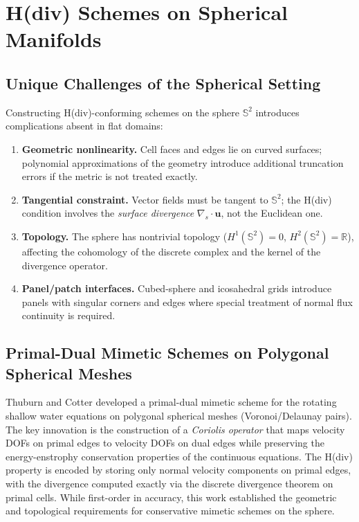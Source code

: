 \section{H(div) Schemes on Spherical Manifolds}

\subsection{Unique Challenges of the Spherical Setting}

Constructing H(div)-conforming schemes on the sphere $\mathbb{S}^2$
introduces complications absent in flat domains:
\begin{enumerate}[nosep]
  \item \textbf{Geometric nonlinearity.} Cell faces and edges lie on
        curved surfaces; polynomial approximations of the geometry
        introduce additional truncation errors if the metric is not
        treated exactly.
  \item \textbf{Tangential constraint.} Vector fields must be tangent to
        $\mathbb{S}^2$; the H(div) condition involves the \emph{surface
        divergence} $\nabla_s \cdot \mathbf{u}$, not the Euclidean one.
  \item \textbf{Topology.} The sphere has nontrivial topology ($H^1(\mathbb{S}^2)=0$,
        $H^2(\mathbb{S}^2)=\mathbb{R}$), affecting the cohomology of the
        discrete complex and the kernel of the divergence operator.
  \item \textbf{Panel/patch interfaces.} Cubed-sphere and icosahedral grids
        introduce panels with singular corners and edges where special
        treatment of normal flux continuity is required.
\end{enumerate}

\subsection{Primal-Dual Mimetic Schemes on Polygonal Spherical Meshes}

Thuburn and Cotter \cite{thuburn2012primal} developed a primal-dual mimetic
scheme for the rotating shallow water equations on polygonal spherical meshes
(Voronoi/Delaunay pairs). The key innovation is the construction of a
\emph{Coriolis operator} that maps velocity DOFs on primal edges to velocity
DOFs on dual edges while preserving the energy-enstrophy conservation
properties of the continuous equations. The H(div) property is encoded by
storing only normal velocity components on primal edges, with the divergence
computed exactly via the discrete divergence theorem on primal cells. While
first-order in accuracy, this work established the geometric and
topological requirements for conservative mimetic schemes on the sphere.


